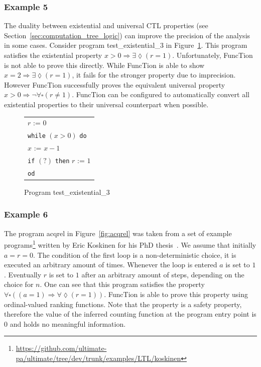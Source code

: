 \documentclass[11pt,a4paper,titlepage]{article}
\theoremstyle{definition}
\begin{document}
\subsubsection*{Example 5}

The duality between existential and universal CTL properties (see Section~\ref{sec:computation_tree_logic}) can improve the precision of 
the analysis in some cases.  
Consider program \textsf{test\_existential\_3} in Figure~\ref{fig:test_existential_3}. This program satisfies the existential property 
$x > 0 \Rightarrow \exists\lozenge(r=1)$. Unfortunately, FuncTion is not able to prove this directly. 
While FuncTion is able to show $x = 2 \Rightarrow \exists\lozenge(r=1)$, it fails for the stronger property due to imprecision. 
However FuncTion successfully proves the equivalent universal property $x > 0 \Rightarrow \neg \forall\square(r \neq 1)$. 
FuncTion can be configured to automatically convert all existential properties to their universal counterpart when possible.\\

\begin{figure}
    \begin{center}
        \begin{tabular}{l}
            $r$ := $0$ \\
            \texttt{while} $(x > 0)$ \texttt{do} \\
            \hspace{1em}$x$ := $x - 1$ \\
            \hspace{1em}\texttt{if} $(?)$ \texttt{then} $r$ := $1$ \\
            \texttt{od}
        \end{tabular}
    \end{center}
    \vspace{-1em}
    \caption{Program \textsf{test\_existential\_3}}
    \label{fig:test_existential_3}
\end{figure}

\subsubsection*{Example 6}

The program \textsf{acqrel} in Figure~\ref{fig:acqrel} was taken from a set of example 
programs\footnote{\url{https://github.com/ultimate-pa/ultimate/tree/dev/trunk/examples/LTL/koskinen}} 
written by Eric Koskinen for his PhD thesis~\cite{KoskinenPhd}. We assume that initially $a = r = 0$.
The condition of the first loop is a non-deterministic choice, it is executed an arbitrary amount of times. 
Whenever the loop is entered $a$ is set to $1$. Eventually $r$ is set to $1$ after an arbitrary amount of steps, 
depending on the choice for $n$. One can see that this program satisfies the property 
$\forall\square((a = 1) \Rightarrow \forall\lozenge(r = 1))$. 
FuncTion is able to prove this property using ordinal-valued ranking functions.
Note that the property is a safety property, therefore the value of 
the inferred counting function at the program entry point is $0$ and holds no meaningful information. \\
\end{document}
